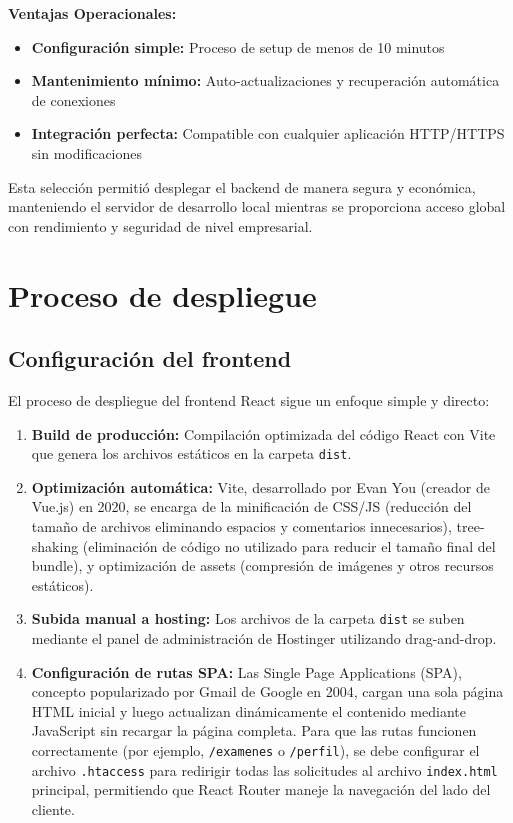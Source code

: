 \documentclass[12pt,a4paper]{report}
\begin{document}
\textbf{Ventajas Operacionales:}
\begin{itemize}
\item \textbf{Configuración simple:} Proceso de setup de menos de 10 minutos
\item \textbf{Mantenimiento mínimo:} Auto-actualizaciones y recuperación automática de conexiones
\item \textbf{Integración perfecta:} Compatible con cualquier aplicación HTTP/HTTPS sin modificaciones
\end{itemize}

Esta selección permitió desplegar el backend de manera segura y económica, manteniendo el servidor de desarrollo local mientras se proporciona acceso global con rendimiento y seguridad de nivel empresarial.

\section{Proceso de despliegue}

\subsection{Configuración del frontend}

El proceso de despliegue del frontend React sigue un enfoque simple y directo:

\begin{enumerate}
\item \textbf{Build de producción:} Compilación optimizada del código React con Vite que genera los archivos estáticos en la carpeta \texttt{dist}.
\item \textbf{Optimización automática:} Vite, desarrollado por Evan You (creador de Vue.js) en 2020, se encarga de la minificación de CSS/JS (reducción del tamaño de archivos eliminando espacios y comentarios innecesarios), tree-shaking (eliminación de código no utilizado para reducir el tamaño final del bundle), y optimización de assets (compresión de imágenes y otros recursos estáticos).
\item \textbf{Subida manual a hosting:} Los archivos de la carpeta \texttt{dist} se suben mediante el panel de administración de Hostinger utilizando drag-and-drop.
\item \textbf{Configuración de rutas SPA:} Las Single Page Applications (SPA), concepto popularizado por Gmail de Google en 2004, cargan una sola página HTML inicial y luego actualizan dinámicamente el contenido mediante JavaScript sin recargar la página completa. Para que las rutas funcionen correctamente (por ejemplo, \texttt{/examenes} o \texttt{/perfil}), se debe configurar el archivo \texttt{.htaccess} para redirigir todas las solicitudes al archivo \texttt{index.html} principal, permitiendo que React Router maneje la navegación del lado del cliente.
\end{enumerate}
\end{document}
